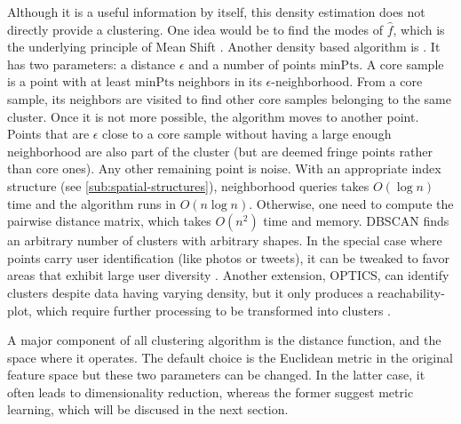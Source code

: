 Although it is a useful information by itself, this density estimation does
not directly provide a clustering. One idea would be to find the modes of
$\hat{f}$, which is the underlying principle of Mean Shift
\autocite{MeanShift95}. Another density based algorithm is
 \autocite{DBSCAN96}. It has two parameters: a
distance $\epsilon$ and a number of points $\mathrm{minPts}$. A core sample is
a point with at least $\mathrm{minPts}$ neighbors in its
$\epsilon$-neighborhood. From a core sample, its neighbors are visited to find
other core samples belonging to the same cluster. Once it is not more possible,
the algorithm moves to another point. Points that are $\epsilon$ close to a
core sample without having a large enough neighborhood are also part of the
cluster (but are deemed fringe points rather than core ones). Any other
remaining point is noise. With an appropriate index structure (see
\autoref{sub:spatial-structures}), neighborhood queries takes $O(\log n)$ time
and the algorithm runs in $O(n\log n)$. Otherwise, one need to compute the
pairwise distance matrix, which takes $O(n^2)$ time and memory. DBSCAN finds
an arbitrary number of clusters with arbitrary shapes. In the special case where
points carry user identification (like photos or tweets), it can be tweaked to
favor areas that exhibit large user diversity \autocite{PDBSCANKisilevich2010}.
Another extension, OPTICS, can identify clusters despite data having varying
density, but it only produces a reachability-plot, which require further
processing to be transformed into clusters \autocite{OPTICS99}.

\iffalse
\begin{comments}
	I didn't use these methods so I probably don't need to talk about it\\
	Some are based on graphs. For instance \methodname{Spectral
	Clustering} \autocite{SpectralClustering01} (which is related to
	Kernel $k$-means, as shown by \textcite{KernelKmeans04}).
	\methodname{Affinity Propagation} \autocite{AffinityPropagation07}

	Others are hierarchical
\url{https://en.wikipedia.org/wiki/Hierarchical_clustering}
\end{comments}
\fi

A major component of all clustering algorithm is the distance function, and
the space where it operates. The default choice is the Euclidean metric in the
original feature space but these two parameters can be changed. In the latter
case, it often leads to dimensionality reduction, whereas the former suggest
metric learning, which will be discused in the next section.

